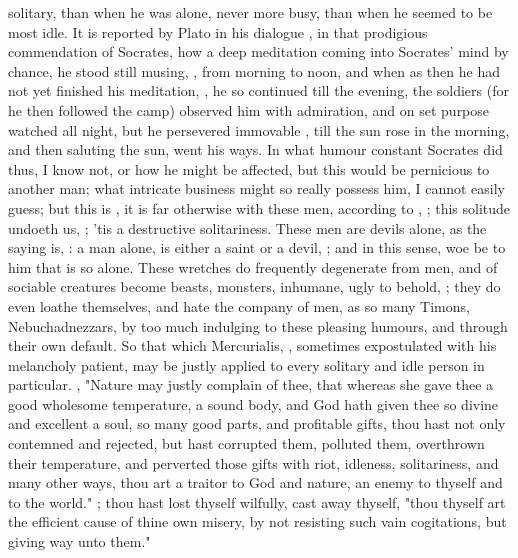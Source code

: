 solitary, than when he was alone, never more busy, than when he seemed to be
most idle. It is reported by Plato in his dialogue , in that prodigious commendation of Socrates, how a deep meditation
coming into Socrates' mind by chance, he stood still musing, , from morning to noon, and when as then he had not yet finished
his meditation, , he so continued till the evening, the
soldiers (for he then followed the camp) observed him with admiration, and on
set purpose watched all night, but he persevered immovable , till the sun rose in the morning, and then saluting the sun, went his
ways. In what humour constant Socrates did thus, I know not, or how he might be
affected, but this would be pernicious to another man; what intricate business
might so really possess him, I cannot easily guess; but this is , it is far otherwise with these men, according to \Seneca{}, ; this solitude undoeth us, ; 'tis a destructive solitariness. These men are devils alone, as the
saying is, : a man alone, is either a saint
or a devil, ; and
 in this sense, woe be to him that is so
alone. These wretches do frequently degenerate from men, and of sociable
creatures become beasts, monsters, inhumane, ugly to behold, ;
they do even loathe themselves, and hate the company of men, as so many Timons,
Nebuchadnezzars, by too much indulging to these pleasing humours, and through
their own default. So that which Mercurialis, , sometimes expostulated with his melancholy patient, may be justly applied
to every solitary and idle person in particular.
, \etc{} "Nature
may justly complain of thee, that whereas she gave thee a good wholesome
temperature, a sound body, and God hath given thee so divine and excellent a
soul, so many good parts, and profitable gifts, thou hast not only contemned
and rejected, but hast corrupted them, polluted them, overthrown their
temperature, and perverted those gifts with riot, idleness, solitariness, and
many other ways, thou art a traitor to God and nature, an enemy to thyself and
to the world." ; thou hast lost thyself wilfully, cast
away thyself, "thou thyself art the efficient cause of thine own misery, by not
resisting such vain cogitations, but giving way unto them."


